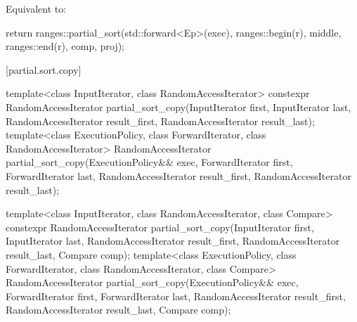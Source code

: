 \begin{itemdescr}
\pnum
\effects
Equivalent to:
\begin{codeblock}
return ranges::partial_sort(std::forward<Ep>(exec), ranges::begin(r), middle,
                            ranges::end(r), comp, proj);
\end{codeblock}
\end{itemdescr}

[partial.sort.copy]{}

%
\begin{itemdecl}
template<class InputIterator, class RandomAccessIterator>
  constexpr RandomAccessIterator
    partial_sort_copy(InputIterator first, InputIterator last,
                      RandomAccessIterator result_first,
                      RandomAccessIterator result_last);
template<class ExecutionPolicy, class ForwardIterator, class RandomAccessIterator>
  RandomAccessIterator
    partial_sort_copy(ExecutionPolicy&& exec,
                      ForwardIterator first, ForwardIterator last,
                      RandomAccessIterator result_first,
                      RandomAccessIterator result_last);

template<class InputIterator, class RandomAccessIterator,
         class Compare>
  constexpr RandomAccessIterator
    partial_sort_copy(InputIterator first, InputIterator last,
                      RandomAccessIterator result_first,
                      RandomAccessIterator result_last,
                      Compare comp);
template<class ExecutionPolicy, class ForwardIterator, class RandomAccessIterator,
         class Compare>
  RandomAccessIterator
    partial_sort_copy(ExecutionPolicy&& exec,
                      ForwardIterator first, ForwardIterator last,
                      RandomAccessIterator result_first,
                      RandomAccessIterator result_last,
                      Compare comp);


\end{itemdecl}
